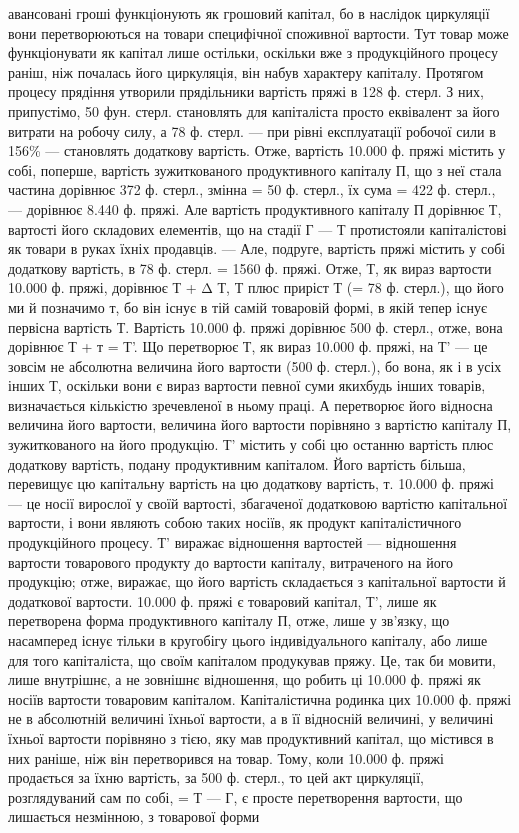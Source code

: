 \parcont{}  %
авансовані гроші функціонують як грошовий капітал, бо в наслідок
циркуляції вони перетворюються на товари специфічної споживної
вартости. Тут товар може функціонувати як капітал лише остільки,
оскільки вже з продукційного процесу раніш, ніж почалась його циркуляція,
він набув характеру капіталу. Протягом процесу прядіння утворили
прядільники вартість пряжі в 128 ф. стерл. З них, припустімо, 50 фун.
стерл. становлять для капіталіста просто еквівалент за його витрати на
робочу силу, а 78 ф. стерл. — при рівні експлуатації робочої сили в 156\%
— становлять додаткову вартість. Отже, вартість 10.000 ф. пряжі містить у
собі, поперше, вартість зужиткованого продуктивного капіталу П, що з неї
стала частина дорівнює 372 ф. стерл., змінна = 50 ф. стерл., їх
сума = 422 ф. стерл., — дорівнює 8.440 ф. пряжі. Але вартість
продуктивного капіталу П дорівнює Т, вартості його складових елементів,
що на стадії Г — Т протистояли капіталістові як товари в руках їхніх
продавців. — Але, подруге, вартість пряжі містить у собі додаткову вартість,
в 78 ф. стерл. = 1560 ф. пряжі. Отже, Т, як вираз вартости 10.000 ф.
пряжі, дорівнює Т + Δ Т, Т плюс приріст Т (= 78 ф. стерл.), що його ми й
позначимо т, бо він існує в тій самій товаровій формі, в якій тепер існує
первісна вартість Т. Вартість 10.000 ф. пряжі дорівнює 500 ф. стерл., отже,
вона дорівнює Т + т = Т'. Що перетворює Т, як вираз 10.000 ф. пряжі, на
Т' — це зовсім не абсолютна величина його вартости (500 ф. стерл.), бо вона,
як і в усіх інших Т, оскільки вони є вираз вартости певної суми якихбудь
інших товарів, визначається кількістю зречевленої в ньому праці.
А перетворює його відносна величина його вартости, величина його
вартости порівняно з вартістю капіталу П, зужиткованого на його
продукцію. Т' містить у собі цю останню вартість плюс додаткову
вартість, подану продуктивним капіталом. Його вартість більша, перевищує
цю капітальну вартість на цю додаткову вартість, т. 10.000 ф.
пряжі — це носії вирослої у своїй вартості, збагаченої додатковою вартістю
капітальної вартости, і вони являють собою таких носіїв, як
продукт капіталістичного продукційного процесу. Т' виражає відношення
вартостей — відношення вартости товарового продукту до
вартости капіталу, витраченого на його продукцію; отже, виражає, що
його вартість складається з капітальної вартости й додаткової вартости.
10.000 ф. пряжі є товаровий капітал, Т', лише як перетворена форма
продуктивного капіталу П, отже, лише у зв’язку, що насамперед існує
тільки в кругобігу цього індивідуального капіталу, або лише для того
капіталіста, що своїм капіталом продукував пряжу. Це, так би мовити,
лише внутрішнє, а не зовнішнє відношення, що робить ці 10.000 ф.
пряжі як носіїв вартости товаровим капіталом. Капіталістична родинка
цих 10.000 ф. пряжі не в абсолютній величині їхньої вартости, а в її відносній
величині, у величині їхньої вартости порівняно з тією, яку мав
продуктивний капітал, що містився в них раніше, ніж він перетворився
на товар. Тому, коли 10.000 ф. пряжі продається за їхню вартість, за
500 ф. стерл., то цей акт циркуляції, розглядуваний сам по собі, = Т — Г,
є просте перетворення вартости, що лишається незмінною, з товарової форми
\parbreak{}  %
